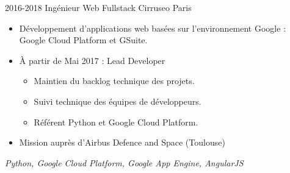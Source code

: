 \cventry
    {2016-2018}
    {Ingénieur Web Fullstack}
    {}
    {Cirruseo}
    {Paris}
    {
        \begin{itemize}
            \item Développement d'applications web basées sur l'environnement Google : Google Cloud Platform et GSuite.
            \item À partir de Mai 2017 : Lead Developer
            \begin{itemize}
                \item Maintien du backlog technique des projets.
                \item Suivi technique des équipes de développeurs.
                \item Référent Python et Google Cloud Platform.
            \end{itemize}
            \item Mission auprès d'Airbus Defence and Space (Toulouse)
        \end{itemize}
        \textit{Python, Google Cloud Platform, Google App Engine, AngularJS}
    }
\vspace*{0.2cm}
